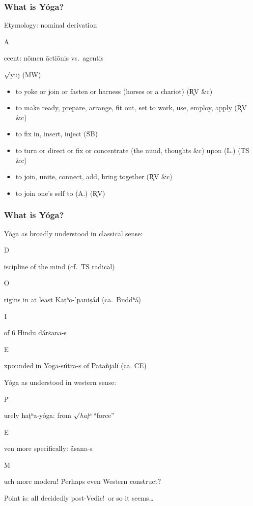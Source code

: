 \documentclass[pdf]{beamer}
\newcommand{\Subitem}[1]{{\setlength\itemindent{12pt} \item[-] #1}}
\newcommand{\Subsubitem}[1]{{\setlength\itemindent{24pt} \item[○] #1}}
\begin{document}
\begin{frame} \frametitle{What is Yóga?}
\begin{itemize}
	\item Etymology: nominal derivation
	\Subitem Accent: nōmen āctiōnis vs.~agentis
\end{itemize}

\begin{block} {$\surd$yuj (MW)}
\begin{itemize}
	\item to yoke or join or fasten or harness (horses or a chariot) (R̥V \&c)
	\item to make ready, prepare, arrange, fit out, set to work, use, employ, apply (R̥V \&c)
	\item to fix in, insert, inject (ṠB)
	\item to turn or direct or fix or concentrate (the mind, thoughts \&c) upon (L.) (TS \&c)
	\item to join, unite, connect, add, bring together (R̥V \&c)
	\item to join one's self to (A.) (R̥V)
\end{itemize}
\end{block}
\end{frame}

\begin{frame} \frametitle{What is Yóga?}
\begin{itemize}
	\item Yóga as broadly understood in classical sense:
	\Subitem Discipline of the mind (cf.~TS radical)
	\Subitem Origins in at least Kaṭʰo-'paniṣád (ca.~Buddʰá)
	\Subitem 1 of 6 Hindu dárṡana-s
	\Subitem Expounded in Yoga-sū́tra-s of Patañjalí (ca. CE)
	\pause \item Yóga as understood in western sense:
	\Subitem Purely haṭʰa-yóga: from $\surd$\textit{haṭʰ} ``force''
	\Subsubitem Even more specifically: ā́sana-s
	\Subitem Much more modern! Perhaps even Western construct?
	\pause \item Point is: all decidedly post-Vedic!~or so it seems\ldots
\end{itemize}
\end{frame}
\end{document}
